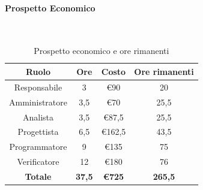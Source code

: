 \documentclass{article}
\begin{document}
                \paragraph{Prospetto Economico}\mbox{}\\
                \begin{table}[H]
                    \centering
                    \begin{tabular}{|c|c|c|c|}
                    \hline
                    \textbf{Ruolo}  & \textbf{Ore}  & \textbf{Costo} & \textbf{Ore rimanenti} \\ \hline
                    Responsabile    & 3             & €90            & 20                     \\ \hline
                    Amministratore  & 3,5           & €70            & 25,5                     \\ \hline
                    Analista        & 3,5           & €87,5          & 25,5                     \\ \hline
                    Progettista     & 6,5           & €162,5         & 43,5                     \\ \hline
                    Programmatore   & 9            & €135           & 75                     \\ \hline
                    Verificatore    & 12            & €180           & 76                     \\ \hline
                    \textbf{Totale} & \textbf{37,5} & \textbf{\euro725}   & \textbf{265,5}           \\ \hline
                    \end{tabular}
                    \caption{Prospetto economico e ore rimanenti}
                \end{table}
\end{document}

